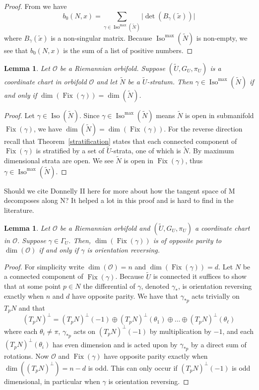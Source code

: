 \documentclass{amsart}
\theoremstyle{plain}
\newtheorem{lemma}[thm]{Lemma}
\theoremstyle{definition}
\theoremstyle{remark}
\newcommand{\myabs}[1]{\vert#1\vert}
\newcommand{\wtu}{\widetilde{U}}
\newcommand{\wtn}{\widetilde{N}}
\newcommand{\orb}{\mathcal O}
\newcommand{\cc}{(\widetilde{U}, G_U, \pi_U)}
\DeclareMathOperator{\iso}{Iso}
\DeclareMathOperator{\fix}{Fix}
\begin{document}
\begin{proof} From \cite[p.16]{dggw} we have $$b_0(N,x) = \sum_{\gamma \in \iso^{\max}(\widetilde N)} \myabs{\det(B_\gamma(\tilde{x})) }$$
where $B_\gamma(\tilde{x})$ is a non-singular matrix.  Because $\iso^{\max}(\widetilde N)$ is non-empty, we see that $b_0(N,x)$ is the sum of a list of positive numbers.
\end{proof}

\begin{lemma}\label{lem:dim_of_fix} Let $\orb$ be a Riemannian orbifold. Suppose $(\widetilde{U}, G_U, \pi_U)$ is a coordinate chart in orbifold $\orb$ and let $\widetilde{N}$ be a $\widetilde{U}$-stratum.  Then $\gamma \in \iso^{\max}(\wtn)$ if and only if $\dim(\fix(\gamma)) = \dim(\widetilde{N})$.
\end{lemma}

\begin{proof}
Let $\gamma \in \iso(\wtn)$.  Since $\gamma \in \iso^{\max}(\wtn)$ means $\wtn$ is open in submanifold $\fix(\gamma)$, we have $\dim(\widetilde{N}) = \dim(\fix(\gamma))$. For the reverse direction recall that Theorem~\ref{stratification} states that each connected component of $\fix(\gamma)$ is stratified by a set of $\wtu$-strata, one of which is $\widetilde{N}$.  By \cite[Remark 2.9(i)]{dggw} maximum dimensional strata are open.  We see $\widetilde{N}$ is open in $\fix(\gamma)$, thus $\gamma \in \iso^{\max}(\wtn)$.
\end{proof}

Should we cite Donnelly II here for more about how the tangent space of M decomposes along N?  It helped a lot in this proof and is hard to find in the literature.

\begin{lemma}\label{lem:dim-of-ori-rev} Let $\orb$ be a Riemannian orbifold and $\cc$ a coordinate chart in $\orb$. Suppose $\gamma \in \Gamma_U$. Then, $\dim(\fix(\gamma))$ is of opposite parity to $\dim(\mathcal{O})$ if and only if $\gamma$ is orientation reversing. 
\end{lemma}  
\begin{proof}  For simplicity write $\dim(\orb)=n$ and $\dim(\fix(\gamma))=d$.  Let $N$ be a connected component of $\fix(\gamma)$. Because $\wtu$ is connected it suffices to show that at some point $p\in N$ the differential of $\gamma$, denoted $\gamma_*$, is orientation reversing exactly when $n$ and $d$ have opposite parity.  We have that $\gamma_{*p}$ acts trivially on $T_pN$ and that
\[(T_pN)^\perp =  (T_pN)^{\perp}(-1) \oplus  (T_pN)^{\perp}(\theta_1) \oplus \dots \oplus  (T_pN)^{\perp}(\theta_\ell)\]
where each $\theta_i \ne \pi$,  $\gamma_{*p}$ acts on $(T_pN)^{\perp}(-1)$ by multiplication by $-1$, and each $(T_pN)^{\perp}(\theta_i)$ has even dimension and is acted upon by $\gamma_{*p}$ by a direct sum of rotations.  Now $\orb$ and $\fix(\gamma)$ have opposite parity exactly when $\dim((T_pN)^\perp)=n-d$ is odd. This can only occur if $(T_pN)^{\perp}(-1)$ is odd dimensional, in particular when $\gamma$ is orientation reversing.
\end{proof}
\end{document}
